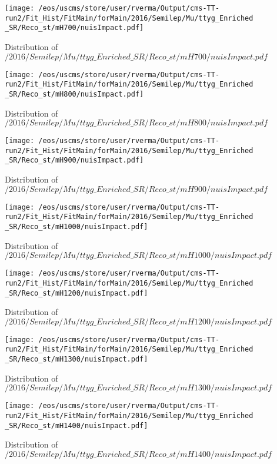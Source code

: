 \begin{figure}
\centering
\texttt{[image: /eos/uscms/store/user/rverma/Output/cms-TT-run2/Fit\_Hist/FitMain/forMain/2016/Semilep/Mu/ttyg\_Enriched\_SR/Reco\_st/mH700/nuisImpact.pdf]}
\caption{Distribution of $/2016/Semilep/Mu/ttyg\_Enriched\_SR/Reco\_st/mH700/nuisImpact.pdf$}
\end{figure}

\begin{figure}
\centering
\texttt{[image: /eos/uscms/store/user/rverma/Output/cms-TT-run2/Fit\_Hist/FitMain/forMain/2016/Semilep/Mu/ttyg\_Enriched\_SR/Reco\_st/mH800/nuisImpact.pdf]}
\caption{Distribution of $/2016/Semilep/Mu/ttyg\_Enriched\_SR/Reco\_st/mH800/nuisImpact.pdf$}
\end{figure}

\begin{figure}
\centering
\texttt{[image: /eos/uscms/store/user/rverma/Output/cms-TT-run2/Fit\_Hist/FitMain/forMain/2016/Semilep/Mu/ttyg\_Enriched\_SR/Reco\_st/mH900/nuisImpact.pdf]}
\caption{Distribution of $/2016/Semilep/Mu/ttyg\_Enriched\_SR/Reco\_st/mH900/nuisImpact.pdf$}
\end{figure}

\begin{figure}
\centering
\texttt{[image: /eos/uscms/store/user/rverma/Output/cms-TT-run2/Fit\_Hist/FitMain/forMain/2016/Semilep/Mu/ttyg\_Enriched\_SR/Reco\_st/mH1000/nuisImpact.pdf]}
\caption{Distribution of $/2016/Semilep/Mu/ttyg\_Enriched\_SR/Reco\_st/mH1000/nuisImpact.pdf$}
\end{figure}

\begin{figure}
\centering
\texttt{[image: /eos/uscms/store/user/rverma/Output/cms-TT-run2/Fit\_Hist/FitMain/forMain/2016/Semilep/Mu/ttyg\_Enriched\_SR/Reco\_st/mH1200/nuisImpact.pdf]}
\caption{Distribution of $/2016/Semilep/Mu/ttyg\_Enriched\_SR/Reco\_st/mH1200/nuisImpact.pdf$}
\end{figure}

\begin{figure}
\centering
\texttt{[image: /eos/uscms/store/user/rverma/Output/cms-TT-run2/Fit\_Hist/FitMain/forMain/2016/Semilep/Mu/ttyg\_Enriched\_SR/Reco\_st/mH1300/nuisImpact.pdf]}
\caption{Distribution of $/2016/Semilep/Mu/ttyg\_Enriched\_SR/Reco\_st/mH1300/nuisImpact.pdf$}
\end{figure}

\begin{figure}
\centering
\texttt{[image: /eos/uscms/store/user/rverma/Output/cms-TT-run2/Fit\_Hist/FitMain/forMain/2016/Semilep/Mu/ttyg\_Enriched\_SR/Reco\_st/mH1400/nuisImpact.pdf]}
\caption{Distribution of $/2016/Semilep/Mu/ttyg\_Enriched\_SR/Reco\_st/mH1400/nuisImpact.pdf$}
\end{figure}

